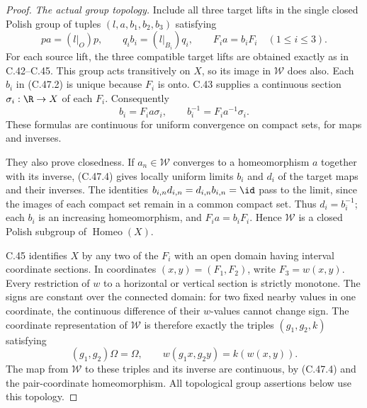 \begin{proof}
\emph{The actual group topology.}
Include all three target lifts in the single closed Polish group
of tuples $(l,a,b_1,b_2,b_3)$ satisfying
\[
 pa=(l|_O)p,\qquad q_i b_i=(l|_{B_i})q_i,\qquad
 F_i a=b_iF_i \quad(1\leq i\leq3).
                                                        \tag{C.47.3}
\]
For each source lift, the three compatible target lifts are
obtained exactly as in C.42--C.45. This group acts transitively
on $X$, so its image in $\mathcal W$ does also.
Each $b_i$ in (C.47.2) is unique because $F_i$ is onto.
C.43 supplies a continuous section
$\sigma_i:\R\to X$ of each $F_i$. Consequently
\[
              b_i=F_i a\sigma_i,\qquad
              b_i^{-1}=F_i a^{-1}\sigma_i.               \tag{C.47.4}
\]
These formulas are continuous for uniform convergence on compact
sets, for maps and inverses.

They also prove closedness. If $a_n\in\mathcal W$ converges to a
homeomorphism $a$ together with its inverse, (C.47.4) gives locally
uniform limits $b_i$ and $d_i$ of the target maps and their
inverses. The identities $b_{i,n}d_{i,n}=d_{i,n}b_{i,n}=\id$
pass to the limit, since the images of each compact set remain
in a common compact set. Thus $d_i=b_i^{-1}$; each $b_i$ is an
increasing homeomorphism, and $F_i a=b_iF_i$. Hence $\mathcal W$
is a closed Polish subgroup of $\operatorname{Homeo}(X)$.

C.45 identifies $X$ by any two of the $F_i$ with an open domain
having interval coordinate sections. In coordinates $(x,y)=(F_1,F_2)$,
write $F_3=w(x,y)$. Every restriction of $w$ to a horizontal or
vertical section is strictly monotone. The signs are constant
over the connected domain: for two fixed nearby values in one
coordinate, the continuous difference of their $w$-values cannot
change sign. The coordinate representation of $\mathcal W$ is
therefore exactly the triples $(g_1,g_2,k)$ satisfying
\[
 (g_1,g_2)\Omega=\Omega,\qquad
 w(g_1x,g_2y)=k(w(x,y)).                                 \tag{C.47.5}
\]
The map from $\mathcal W$ to these triples and its inverse are
continuous, by (C.47.4) and the pair-coordinate homeomorphism.
All topological group assertions below use this topology.


\end{proof}
